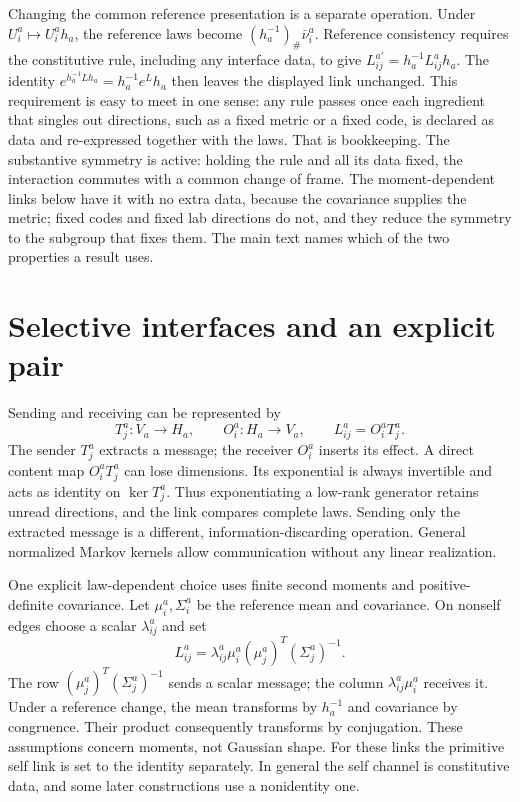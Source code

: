 Changing the common reference presentation is a separate operation. Under $U_i^a\mapsto U_i^a h_a$, the reference laws become $(h_a^{-1})_\#\bar\nu_i^a$. Reference consistency requires the constitutive rule, including any interface data, to give $L_{ij}^{a\prime}=h_a^{-1}L_{ij}^a h_a$. The identity $e^{h_a^{-1}Lh_a}=h_a^{-1}e^Lh_a$ then leaves the displayed link unchanged. This requirement is easy to meet in one sense: any rule passes once each ingredient that singles out directions, such as a fixed metric or a fixed code, is declared as data and re-expressed together with the laws. That is bookkeeping. The substantive symmetry is active: holding the rule and all its data fixed, the interaction commutes with a common change of frame. The moment-dependent links below have it with no extra data, because the covariance supplies the metric; fixed codes and fixed lab directions do not, and they reduce the symmetry to the subgroup that fixes them. The main text names which of the two properties a result uses.

\section{Selective interfaces and an explicit pair}

Sending and receiving can be represented by
\begin{equation}
T_j^a:V_a\longrightarrow H_a,\qquad
O_i^a:H_a\longrightarrow V_a,\qquad
L_{ij}^a=O_i^aT_j^a.
\end{equation}
The sender $T_j^a$ extracts a message; the receiver $O_i^a$ inserts its effect. A direct content map $O_i^aT_j^a$ can lose dimensions. Its exponential is always invertible and acts as identity on $\ker T_j^a$. Thus exponentiating a low-rank generator retains unread directions, and the link compares complete laws. Sending only the extracted message is a different, information-discarding operation. General normalized Markov kernels allow communication without any linear realization.

One explicit law-dependent choice uses finite second moments and positive-definite covariance. Let $\mu_i^a,\Sigma_i^a$ be the reference mean and covariance. On nonself edges choose a scalar $\lambda_{ij}^a$ and set
\begin{equation}
L_{ij}^a=\lambda_{ij}^a\mu_i^a(\mu_j^a)^T(\Sigma_j^a)^{-1}.
\end{equation}
The row $(\mu_j^a)^T(\Sigma_j^a)^{-1}$ sends a scalar message; the column $\lambda_{ij}^a\mu_i^a$ receives it. Under a reference change, the mean transforms by $h_a^{-1}$ and covariance by congruence. Their product consequently transforms by conjugation. These assumptions concern moments, not Gaussian shape. For these links the primitive self link is set to the identity separately. In general the self channel is constitutive data, and some later constructions use a nonidentity one.

